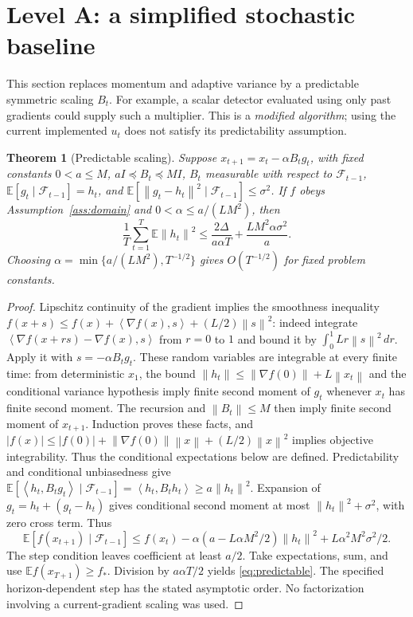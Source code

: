 \documentclass[11pt]{article}
\newtheorem{theorem}{Theorem}[section]
\theoremstyle{definition}
\theoremstyle{remark}
\newcommand{\E}{\mathbb E}
\newcommand{\norm}[1]{\left\lVert#1\right\rVert}
\newcommand{\ip}[2]{\left\langle#1,#2\right\rangle}
\begin{document}
\section{Level A: a simplified stochastic baseline}\label{sec:simplified}
This section replaces momentum and adaptive variance by a predictable
symmetric scaling $B_t$. For example, a scalar detector evaluated using only
past gradients could supply such a multiplier. This is a \emph{modified
algorithm}; using the current implemented $u_t$ does not satisfy its
predictability assumption.

\begin{theorem}[Predictable scaling]\label{thm:predictable}
Suppose $x_{t+1}=x_t-\alpha B_tg_t$, with fixed constants $0<a\le M$,
$aI\preceq B_t\preceq MI$,
$B_t$ measurable with respect to $\mathcal F_{t-1}$,
$\E[g_t\mid\mathcal F_{t-1}]=h_t$, and
$\E[\norm{g_t-h_t}^2\mid\mathcal F_{t-1}]\le\sigma^2$.
If $f$ obeys Assumption~\ref{ass:domain} and $0<\alpha\le a/(LM^2)$, then
\begin{equation}\label{eq:predictable}
 \frac1T\sum_{t=1}^T\E\norm{h_t}^2
 \le\frac{2\Delta}{a\alpha T}+\frac{LM^2\alpha\sigma^2}{a}.
\end{equation}
Choosing $\alpha=\min\{a/(LM^2),T^{-1/2}\}$ gives $O(T^{-1/2})$ for fixed
problem constants.
\end{theorem}
\begin{proof}
Lipschitz continuity of the gradient implies the smoothness inequality
$f(x+s)\le f(x)+\ip{\nabla f(x)}s+(L/2)\norm s^2$: indeed integrate
$\ip{\nabla f(x+rs)-\nabla f(x)}s$ from $r=0$ to $1$ and bound it by
$\int_0^1 Lr\norm s^2\,dr$. Apply it with $s=-\alpha B_tg_t$.
These random variables are integrable at every finite time: from deterministic
$x_1$, the bound $\norm{h_t}\le\norm{\nabla f(0)}+L\norm{x_t}$ and the
conditional variance hypothesis imply finite second moment of $g_t$ whenever
$x_t$ has finite second moment. The recursion and $\norm{B_t}\le M$ then
imply finite second moment of $x_{t+1}$. Induction proves these facts, and
$|f(x)|\le |f(0)|+\norm{\nabla f(0)}\norm{x}+(L/2)\norm{x}^2$ implies
objective integrability. Thus the conditional expectations below are defined.
Predictability and conditional unbiasedness give
$\E[\ip{h_t}{B_tg_t}\mid\mathcal F_{t-1}]=\ip{h_t}{B_th_t}\ge a\norm{h_t}^2$.
Expansion of $g_t=h_t+(g_t-h_t)$ gives conditional second moment at most
$\norm{h_t}^2+\sigma^2$, with zero cross term. Thus
\[
 \E[f(x_{t+1})\mid\mathcal F_{t-1}]
 \le f(x_t)-\alpha(a-L\alpha M^2/2)\norm{h_t}^2
       +L\alpha^2M^2\sigma^2/2.
\]
The step condition leaves coefficient at least $a/2$. Take expectations,
sum, and use $\E f(x_{T+1})\ge f_*$. Division by $a\alpha T/2$ yields
\eqref{eq:predictable}. The specified horizon-dependent step has the stated
asymptotic order. No factorization involving a current-gradient scaling was
used.
\end{proof}
\end{document}
